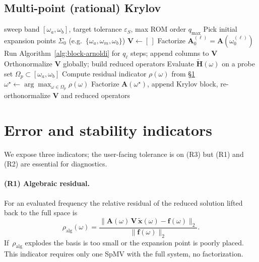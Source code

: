 \documentclass[11pt,a4paper]{article}
\begin{document}
\subsection{Multi-point (rational) Krylov}

\begin{algorithm}[h]
\caption{Adaptive rational Krylov MOR sweep}
\label{alg:rational-krylov}
\begin{algorithmic}[1]
\Require sweep band $[\omega_a,\omega_b]$, target tolerance $\varepsilon_S$, max ROM order $q_{\max}$
\State Pick initial expansion points $\Sigma_0$ (e.g.\ $\{\omega_a,\omega_m,\omega_b\}$)
\State $\bm V \gets [\,]$
  \State Factorize $\bm A_0^{(\ell)} = \bm A(\omega_0^{(\ell)})$
  \State Run Algorithm~\ref{alg:block-arnoldi} for $q_\ell$ steps; append columns to $\bm V$
\EndFor
\State Orthonormalize $\bm V$ globally; build reduced operators
\Repeat
  \State Evaluate $\widetilde{\bm H}(\omega)$ on a probe set $\Omega_p\subset[\omega_a,\omega_b]$
  \State Compute residual indicator $\rho(\omega)$ from \S\ref{sec:residual}
  \State $\omega^\star \gets \arg\max_{\omega\in\Omega_p}\rho(\omega)$
    \State Factorize $\bm A(\omega^\star)$, append Krylov block, re-orthonormalize
  \EndIf
{}
\State \Return $\bm V$ and reduced operators
\end{algorithmic}
\end{algorithm}

\section{Error and stability indicators}\label{sec:residual}

We expose three indicators; the user-facing tolerance is on (R3) but
(R1) and (R2) are essential for diagnostics.

\paragraph{(R1) Algebraic residual.} For an evaluated frequency the relative
residual of the reduced solution lifted back to the full space is
\begin{equation}
  \rho_{\mathrm{alg}}(\omega) =
  \frac{\|\bm A(\omega)\,\bm V\,\widetilde{\bm x}(\omega) - \bm f(\omega)\|_2}
       {\|\bm f(\omega)\|_2}.
\end{equation}
If~$\rho_{\mathrm{alg}}$ explodes the basis is too small or the expansion
point is poorly placed. This indicator requires only one SpMV with the
full system, no factorization.
\end{document}
